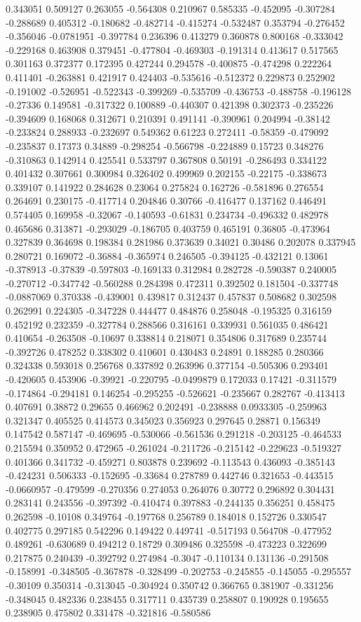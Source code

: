 0.343051 0.509127 0.263055 -0.564308 0.210967 0.585335 -0.452095 -0.307284 -0.288689 0.405312 -0.180682 -0.482714 -0.415274 -0.532487 0.353794 -0.276452 -0.356046 -0.0781951 -0.397784 0.236396 0.413279 0.360878 0.800168 -0.333042 -0.229168 0.463908 0.379451 -0.477804 -0.469303 -0.191314 0.413617 0.517565 0.301163 0.372377 0.172395 0.427244 0.294578 -0.400875 -0.474298 0.222264 0.411401 -0.263881 0.421917 0.424403 -0.535616 -0.512372 0.229873 0.252902 -0.191002 -0.526951 -0.522343 -0.399269 -0.535709 -0.436753 -0.488758 -0.196128 -0.27336 0.149581 -0.317322 0.100889 -0.440307 0.421398 0.302373 -0.235226 -0.394609 0.168068 0.312671 0.210391 0.491141 -0.390961 0.204994 -0.38142 -0.233824 0.288933 -0.232697 0.549362 0.61223 0.272411 -0.58359 -0.479092 -0.235837 0.17373 0.34889 -0.298254 -0.566798 -0.224889 0.15723 0.348276 -0.310863 0.142914 0.425541 0.533797 0.367808 0.50191 -0.286493 0.334122 0.401432 0.307661 0.300984 0.326402 0.499969 0.202155 -0.22175 -0.338673 0.339107 0.141922 0.284628 0.23064 0.275824 0.162726 -0.581896 0.276554 0.264691 0.230175 -0.417714 0.204846 0.30766 -0.416477 0.137162 0.446491 0.574405 0.169958 -0.32067 -0.140593 -0.61831 0.234734 -0.496332 0.482978 0.465686 0.313871 -0.293029 -0.186705 0.403759 0.465191 0.36805 -0.473964 0.327839 0.364698 0.198384 0.281986 0.373639 0.34021 0.30486 0.202078 0.337945 0.280721 0.169072 -0.36884 -0.365974 0.246505 -0.394125 -0.432121 0.13061 -0.378913 -0.37839 -0.597803 -0.169133 0.312984 0.282728 -0.590387 0.240005 -0.270712 -0.347742 -0.560288 0.284398 0.472311 0.392502 0.181504 -0.337748 -0.0887069 0.370338 -0.439001 0.439817 0.312437 0.457837 0.508682 0.302598 0.262991 0.224305 -0.347228 0.444477 0.484876 0.258048 -0.195325 0.316159 0.452192 0.232359 -0.327784 0.288566 0.316161 0.339931 0.561035 0.486421 0.410654 -0.263508 -0.10697 0.338814 0.218071 0.354806 0.317689 0.235744 -0.392726 0.478252 0.338302 0.410601 0.430483 0.24891 0.188285 0.280366 0.324338 0.593018 0.256768 0.337892 0.263996 0.377154 -0.505306 0.293401 -0.420605 0.453906 -0.39921 -0.220795 -0.0499879 0.172033 0.17421 -0.311579 -0.174864 -0.294181 0.146254 -0.295255 -0.526621 -0.235667 0.282767 -0.413413 0.407691 0.38872 0.29655 0.466962 0.202491 -0.238888 0.0933305 -0.259963 0.321347 0.405525 0.414573 0.345023 0.356923 0.297645 0.28871 0.156349 0.147542 0.587147 -0.469695 -0.530066 -0.561536 0.291218 -0.203125 -0.464533 0.215594 0.350952 0.472965 -0.261024 -0.211726 -0.215142 -0.229623 -0.519327 0.401366 0.341732 -0.459271 0.803878 0.239692 -0.113543 0.436093 -0.385143 -0.424231 0.506333 -0.152695 -0.33684 0.278789 0.442746 0.321653 -0.443515 -0.0660957 -0.479599 -0.270356 0.274053 0.264076 0.30772 0.296892 0.304431 0.283141 0.243556 -0.397392 -0.410474 0.397883 -0.244135 0.356251 0.458475 0.262598 -0.10108 0.349764 -0.197768 0.256789 0.184018 0.152726 0.330547 0.402775 0.297185 0.542296 0.149422 0.449741 -0.517193 0.564708 -0.477952 0.489261 -0.630689 0.494212 0.18729 0.309486 0.325598 -0.473223 0.322699 0.217875 0.240439 -0.392792 0.274984 -0.3047 -0.110134 0.131136 -0.291508 -0.158991 -0.348505 -0.367878 -0.328499 -0.202753 -0.245855 -0.145055 -0.295557 -0.30109 0.350314 -0.313045 -0.304924 0.350742 0.366765 0.381907 -0.331256 -0.348045 0.482336 0.238455 0.317711 0.435739 0.258807 0.190928 0.195655 0.238905 0.475802 0.331478 -0.321816 -0.580586 